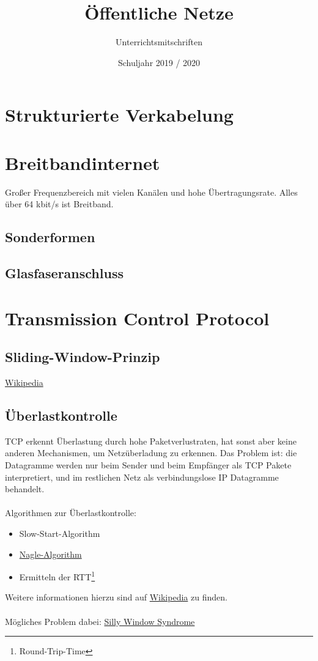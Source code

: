 \documentclass{scrartcl}
\title{Öffentliche Netze}
\subtitle{Unterrichtsmitschriften}
\date{Schuljahr 2019 / 2020}
\begin{document}
\maketitle
\tableofcontents

\section{Strukturierte Verkabelung}

\section{Breitbandinternet}

Großer Frequenzbereich mit vielen Kanälen und hohe Übertragungsrate. Alles über 64 kbit/s ist Breitband.

\subsection{Sonderformen}
\subsection{Glasfaseranschluss}

\section{Transmission Control Protocol}
\subsection{Sliding-Window-Prinzip}

\href{https://en.wikipedia.org/wiki/Sliding_window_protocol}{Wikipedia}

\subsection{Überlastkontrolle}

TCP erkennt Überlastung durch hohe Paketverlustraten, hat sonst aber keine anderen Mechanismen, um Netzüberladung zu erkennen.
Das Problem ist: die Datagramme werden nur beim Sender und beim Empfänger als TCP Pakete interpretiert, und im restlichen Netz als verbindungslose IP Datagramme behandelt.
\\\\
Algorithmen zur Überlastkontrolle:

\begin{itemize}
	\item Slow-Start-Algorithm
	\item \href{https://en.wikipedia.org/wiki/Nagle's_algorithm}{Nagle-Algorithm}
	\item Ermitteln der RTT\footnote{Round-Trip-Time}
\end{itemize}

\noindent
Weitere informationen hierzu sind auf \href{https://en.wikipedia.org/wiki/Sliding_window_protocol}{Wikipedia} zu finden.
\\\\
Mögliches Problem dabei: \href{https://en.wikipedia.org/wiki/Silly_window_syndrome}{Silly Window Syndrome}
\end{document}
